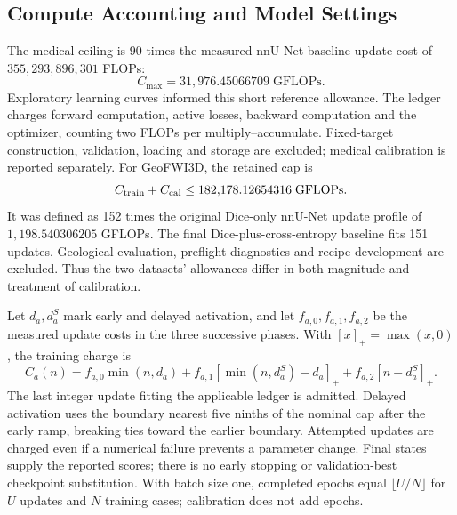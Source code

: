 \documentclass[12pt,a4paper]{article}
\begin{document}
\subsection{Compute Accounting and Model Settings}
\label{sec:detailed-resource-accounting}\label{sec:geological-budget-details}
\label{sec:implementation-tables}\label{sec:conventional-implementation}

The medical ceiling is 90 times the measured nnU-Net baseline update
cost of $355{,}293{,}896{,}301$ FLOPs:
\begin{equation}
C_{\max}=31{,}976.45066709\;\mathrm{GFLOPs}.
\label{eq:main-numerical-cap}
\end{equation}
Exploratory learning curves informed this short reference allowance.
The ledger charges forward computation, active losses, backward
computation and the optimizer, counting two FLOPs per
multiply--accumulate. Fixed-target construction, validation, loading
and storage are excluded; medical calibration is reported separately.
For GeoFWI3D, the retained cap is
\begin{equation}
C_{\rm train}+C_{\rm cal}\leq182{,}178.12654316\;\mathrm{GFLOPs}.
\label{eq:geological-compute-cap}
\end{equation}
It was defined as 152 times the original Dice-only nnU-Net update
profile of $1{,}198.540306205$ GFLOPs. The final Dice-plus-cross-entropy
baseline fits 151 updates. Geological evaluation, preflight diagnostics
and recipe development are excluded. Thus the two datasets' allowances
differ in both magnitude and treatment of calibration.

Let $d_a,d_a^S$ mark early and delayed activation, and let
$f_{a,0},f_{a,1},f_{a,2}$ be the measured update costs in the three
successive phases. With $[x]_+=\max(x,0)$, the training charge is
\begin{equation}
C_a(n)=f_{a,0}\min(n,d_a)
+f_{a,1}[\min(n,d_a^S)-d_a]_+
+f_{a,2}[n-d_a^S]_+.
\label{eq:piecewise-optimization-cost}
\end{equation}
The last integer update fitting the applicable ledger is admitted.
Delayed activation uses the boundary nearest five ninths of the
nominal cap after the early ramp, breaking ties toward the earlier
boundary. Attempted updates are charged even if a numerical failure
prevents a parameter change. Final states supply the reported scores;
there is no early stopping or validation-best checkpoint substitution.
With batch size one, completed epochs equal $\lfloor U/N\rfloor$
for $U$ updates and $N$ training cases; calibration does not add epochs.
\end{document}
